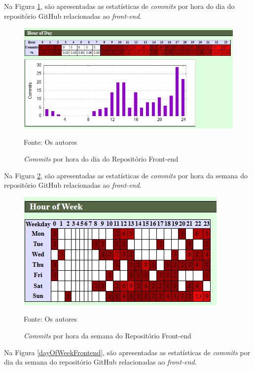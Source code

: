\begin{apendicesenv}
Na Figura \ref{hourOfDayFrontend}, são apresentadas as estatísticas de \textit{commits} por hora do dia do repositório GitHub relacionadas ao \textit{front-end}.

\begin{figure}[H]
	\centering
	\includegraphics[scale=0.7]{./imagens/metricas/gitStatsFrontend/activity/hourOfDay.png}
	\caption{\textit{Commits} por hora do dia do Repositório Front-end}
	Fonte: Os autores
    \label{hourOfDayFrontend}
\end{figure}
\pagebreak

Na Figura \ref{hourOfWeekFrontend}, são apresentadas as estatísticas de \textit{commits} por hora da semana do repositório GitHub relacionadas ao \textit{front-end}.

\begin{figure}[H]
	\centering
	\includegraphics[scale=1]{./imagens/metricas/gitStatsFrontend/activity/hourOfWeek.png}
	\caption{\textit{Commits} por hora da semana do Repositório Front-end}
	Fonte: Os autores
    \label{hourOfWeekFrontend}
\end{figure}

Na Figura \ref{dayOfWeekFrontend}, são apresentadas as estatísticas de \textit{commits} por dia da semana do repositório GitHub relacionadas ao \textit{front-end}.


\end{apendicesenv}
